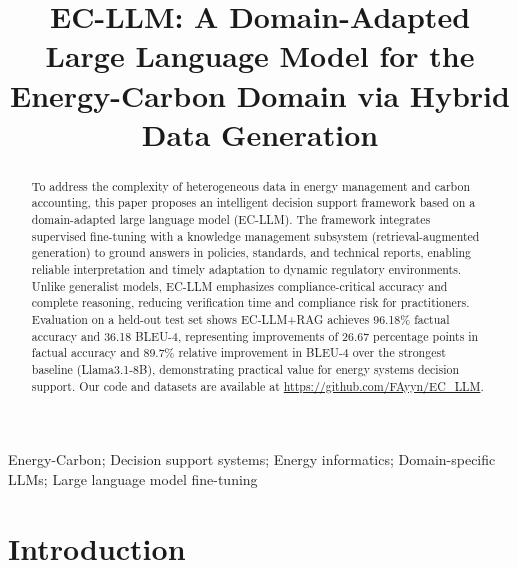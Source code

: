 \documentclass[]{interact}
\theoremstyle{plain}%
\theoremstyle{definition}
\theoremstyle{remark}
\begin{document}
\sloppy


\title{EC-LLM: A Domain-Adapted Large Language Model for the Energy-Carbon Domain via Hybrid Data Generation}

\author{
}

\maketitle

\begin{abstract}
To address the complexity of heterogeneous data in energy management and carbon accounting, this paper proposes an intelligent decision support framework based on a domain-adapted large language model (EC-LLM). The framework integrates supervised fine-tuning with a knowledge management subsystem (retrieval-augmented generation) to ground answers in policies, standards, and technical reports, enabling reliable interpretation and timely adaptation to dynamic regulatory environments. Unlike generalist models, EC-LLM emphasizes compliance-critical accuracy and complete reasoning, reducing verification time and compliance risk for practitioners. Evaluation on a held-out test set shows EC-LLM+RAG achieves 96.18\% factual accuracy and 36.18 BLEU-4, representing improvements of 26.67 percentage points in factual accuracy and 89.7\% relative improvement in BLEU-4 over the strongest baseline (Llama3.1-8B), demonstrating practical value for energy systems decision support. Our code and datasets are available at \url{https://github.com/FAyyn/EC\_LLM}.
\end{abstract}

\begin{keywords}
Energy-Carbon; Decision support systems; Energy informatics; Domain-specific LLMs; Large language model fine-tuning
\end{keywords}


\section{Introduction}
\end{document}
